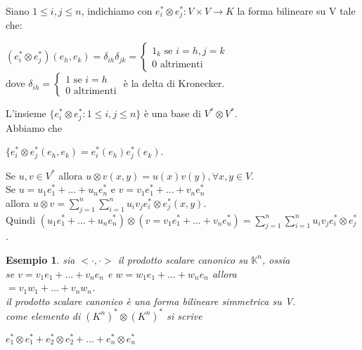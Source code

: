 \documentclass[a4paper,12pt]{article}
\theoremstyle{def}
\theoremstyle{prop}
\theoremstyle{esempio}
\newtheorem*{example}{Esempio}
\theoremstyle{dimostrazione}
\theoremstyle{teo}
\theoremstyle{osservazione}
\begin{document}
Siano \(1 \leq i,j \leq n\), indichiamo con \(e_i^* \otimes e_j^* : V \times V \rightarrow K\) la forma bilineare su V tale che:
\begin{center}
	\((e_i^* \otimes e_j^*)(e_h, e_k) = \delta_{ih} \delta_{jk} = \begin{cases}
		1_k \text{ se } i = h, j = k \\
		0 \text{ altrimenti}
	\end{cases}\)\\
	dove \(\delta_{ih} = \begin{cases}
		1 \text{ se } i = h \\
		0 \text{ altrimenti}
	\end{cases}\) è la delta di Kronecker.
\end{center}
L'insieme \(\{e_i^* \otimes e_j^* : 1 \leq i,j \leq n\}\) è una base di \(V^* \otimes V^*\).\\
Abbiamo che
\begin{center}
	\(\{e_i^* \otimes e_j^* (e_h, e_k) = e_i^*(e_h)e_j^*(e_k)\).\\
\end{center}
Se \(u, v \in V^*\) allora \(u \otimes v (x, y) = u(x) v(y), \forall x,y \in V \).\\
Se \(u = u_1e_1^* + ... + u_n e_n^*\) e \(v = v_1 e_1^* + ... + v_n e_n^*\)\\
allora \(u \otimes v = \sum_{j = 1}^{n} \sum_{i = 1}^{n} u_i v_j e_i^* \otimes e_j^*(x,y)\).\\
Quindi \((u_1e_1^* + ... + u_n e_n^*) \otimes (v = v_1 e_1^* + ... + v_n e_n^*) = \sum_{j = 1}^{n} \sum_{i = 1}^{n} u_i v_j e_i^* \otimes e_j^*\).\\

\begin{example}
	sia \(<\cdot, \cdot>\) il prodotto scalare canonico su \(\mathbb{K}^n\), ossia\\
	se \(v = v_1 e_1 + ... + v_n e_n\) e \(w = w_1 e_1 + ... + w_n e_n\) allora\\
	\(< v, w >= v_1 w_1 + ... + v_n w_n\).\\
	il prodotto scalare canonico è una forma bilineare simmetrica su V.\\
	come elemento di \((K^n)^* \otimes (K^n)^*\) si scrive
	\begin{center}
		\(e_1^* \otimes e_1^* + e_2^* \otimes e_2^* + ... + e_n^* \otimes e_n^*\)
	\end{center}
\end{example}
\end{document}
